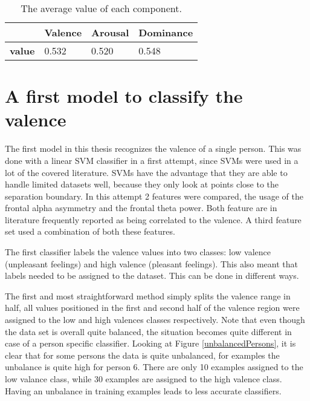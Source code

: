 \begin{table}[H]
\centering
\begin{tabular}{l|lll}
\textbf{}  & \textbf{Valence} & \textbf{Arousal} & \textbf{Dominance} \\ \hline
\textbf{value} & 0.532     	  & 0.520  			 & 0.548
\end{tabular}
\caption{The average value of each component.\label{avg-vals}}
\end{table}



\section{A first model to classify the valence}

The first model in this thesis recognizes the valence of a single person. This was done with a linear SVM classifier in a first attempt, since SVMs were used in a lot of the covered literature. SVMs have the advantage that they are able to handle limited datasets well, because they only look at points close to the separation boundary. In this attempt 2 features were compared, the usage of the frontal alpha asymmetry and the frontal theta power. Both feature are in literature frequently reported as being correlated to the valence. A third feature set used a combination of both these features. 

\npar

The first classifier labels the valence values into two classes: low valence (unpleasant feelings) and high valence (pleasant feelings). This also meant that labels needed to be assigned to the dataset. This can be done in different ways. 

The first and most straightforward method simply splits the valence range in half, all values positioned in the first and second half of the valence region were assigned to the low and high valences classes respectively. Note that even though the data set is overall quite balanced, the situation becomes quite different in case of a person specific classifier. Looking at Figure \ref{unbalancedPersons}, it is clear that for some persons the data is quite unbalanced, for examples the unbalance is quite high for person 6. There are only 10 examples assigned to the low valance class, while 30 examples are assigned to the high valence class. Having an unbalance in training examples leads to less accurate classifiers.


